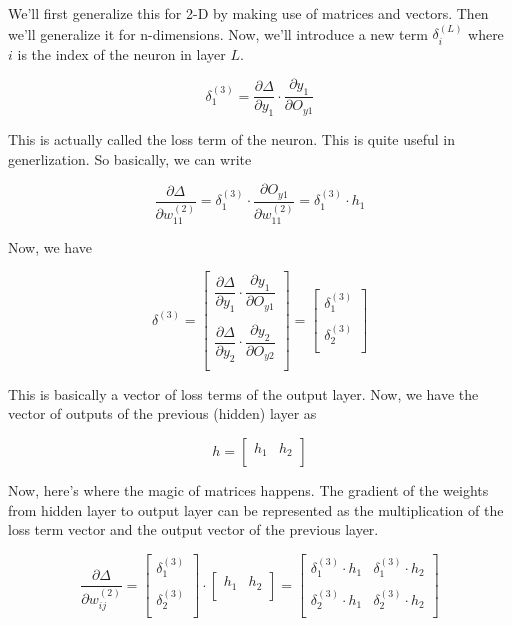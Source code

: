 \documentclass[12pt]{article}
\begin{document}
We'll first generalize this for 2-D by making use of matrices and vectors. Then we'll generalize it for n-dimensions. Now, we'll introduce a new term \(\delta_i ^{(L)}\) where \(i\) is the index of the neuron in layer \(L\). 

\[
  \delta_1 ^{(3)} = \frac{\partial \Delta }{\partial y_1} \cdot \frac{\partial y_1}{\partial O_{y1} }  
\]

This is actually called the loss term of the neuron. This is quite useful in generlization. So basically, we can write 

\[
  \frac{\partial \Delta }{\partial w_{11}^{(2)}} = \delta_1 ^{(3)} \cdot \frac{\partial O_{y1} }{\partial w_{11}^{(2)}} = \delta_1 ^{(3)} \cdot h_1
\]

Now, we have 

\[
  \delta^{(3)} = \begin{bmatrix}
     \dfrac{\partial \Delta }{\partial y_1} \cdot \dfrac{\partial y_1}{\partial O_{y1} }   \\
     \\
     \dfrac{\partial \Delta }{\partial y_2} \cdot \dfrac{\partial y_2}{\partial O_{y2} }   \\
  \end{bmatrix} = \begin{bmatrix}
     \delta_1 ^{(3)} \\
     \\
     \delta_2 ^{(3)} \\
  \end{bmatrix}
\]

This is basically a vector of loss terms of the output layer. Now, we have the vector of outputs of the previous (hidden) layer as 

\[
  h = \begin{bmatrix}
    h_1 &  h_2 \\
  \end{bmatrix}
\]

Now, here's where the magic of matrices happens. The gradient of the weights from hidden layer to output layer can be represented as the multiplication of the loss term vector and the output vector of the previous layer. 

\[ 
  \dfrac{\partial \Delta }{\partial w_{ij}^{(2)} } = \begin{bmatrix}
     \delta_1 ^{(3)} \\
     \\
     \delta_2 ^{(3)} \\
  \end{bmatrix} \cdot \begin{bmatrix}
     h_1 &  h_2 \\
  \end{bmatrix} = \begin{bmatrix}
     \delta_1 ^{(3)} \cdot h_1 & \delta_1 ^{(3)} \cdot h_2 \\
     \\
     \delta_2 ^{(3)} \cdot h_1 & \delta_2 ^{(3)} \cdot h_2 \\
     \end{bmatrix}
\]
\end{document}
